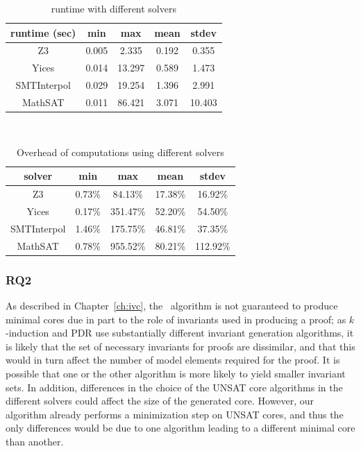 \begin{table}
  \caption{\ucalg runtime with different solvers}
  \centering
  \begin{tabular}{ |c||c|c|c|c| }
    \hline
     runtime (sec) & min & max & mean & stdev \\[0.5ex]
    \hline\hline
    Z3   & 0.005 & 2.335 & 0.192 & 0.355 \\[0.5ex]
    Yices &   0.014  & 13.297   & 0.589 & 1.473 \\[0.5ex]
    SMTInterpol& 0.029 & 19.254 &  1.396 & 2.991 \\[0.5ex]
    MathSAT & 0.011 & 86.421 &  3.071 & 10.403 \\[0.5ex]
    \hline
  \end{tabular} \\
  \label{tab:runtime-ucalg-solvers}
\end{table}

\begin{table}
  \caption{Overhead of \ucalg computations using different solvers}
  \centering
  \begin{tabular}{ |c||c|c|c|c| }
    \hline
     solver & min & max & mean & stdev \\[0.5ex]
    \hline
    Z3   & 0.73\% & 84.13\% & 17.38\% & 16.92\% \\[0.5ex]
    Yices &   0.17\%  & 351.47\%   & 52.20\% & 54.50\% \\[0.5ex]
   SMTInterpol& 1.46\% & 175.75\% &  46.81\% & 37.35\%\\[0.5ex]
    MathSAT & 0.78\% & 955.52\% &  80.21\% & 112.92\%\\[0.5ex]
    \hline
  \end{tabular}
  \label{tab:overhead-ucalg-solvers}
\end{table}

\vspace{0.1in}
\subsubsection{RQ2}
As described in Chapter~\ref{ch:ivc}, the \ucalg\
algorithm is not guaranteed to produce minimal cores due in part to
the role of invariants used in producing a proof; as $k$-induction and
PDR use substantially different invariant generation algorithms, it is
likely that the set of necessary invariants for proofs are dissimilar,
and that this would in turn affect the number of model elements required for
the proof.  It is possible that one or the other algorithm is more likely
to yield smaller invariant sets.  In addition, differences in the choice of the
UNSAT core algorithms in the different solvers could affect the size of the
generated core. However, our algorithm already performs a minimization
step on UNSAT cores, and thus the only differences would be due to one
algorithm leading to a different minimal core than another.

